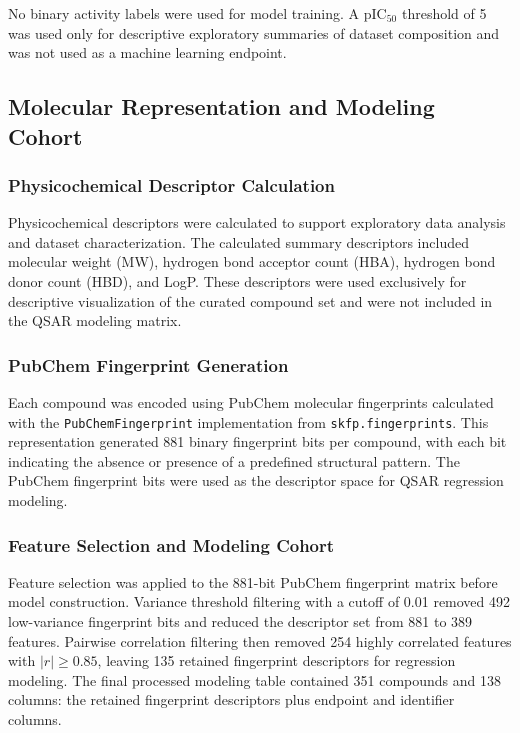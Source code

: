 \documentclass[11pt]{article}
\begin{document}
No binary activity labels were used for model training. A pIC$_{50}$ threshold of 5 was used only for descriptive exploratory summaries of dataset composition and was not used as a machine learning endpoint.

\subsection{Molecular Representation and Modeling Cohort}

\subsubsection{Physicochemical Descriptor Calculation}

Physicochemical descriptors were calculated to support exploratory data analysis and dataset characterization. The calculated summary descriptors included molecular weight (MW), hydrogen bond acceptor count (HBA), hydrogen bond donor count (HBD), and LogP. These descriptors were used exclusively for descriptive visualization of the curated compound set and were not included in the QSAR modeling matrix.

\subsubsection{PubChem Fingerprint Generation}

Each compound was encoded using PubChem molecular fingerprints calculated with the \texttt{PubChem}\allowbreak\texttt{Fingerprint} implementation from \texttt{skfp.}\allowbreak\texttt{fingerprints}. This representation generated 881 binary fingerprint bits per compound, with each bit indicating the absence or presence of a predefined structural pattern. The PubChem fingerprint bits were used as the descriptor space for QSAR regression modeling.

\subsubsection{Feature Selection and Modeling Cohort}

Feature selection was applied to the 881-bit PubChem fingerprint matrix before model construction. Variance threshold filtering with a cutoff of 0.01 removed 492 low-variance fingerprint bits and reduced the descriptor set from 881 to 389 features. Pairwise correlation filtering then removed 254 highly correlated features with $|r| \geq 0.85$, leaving 135 retained fingerprint descriptors for regression modeling. The final processed modeling table contained 351 compounds and 138 columns: the retained fingerprint descriptors plus endpoint and identifier columns.
\end{document}
